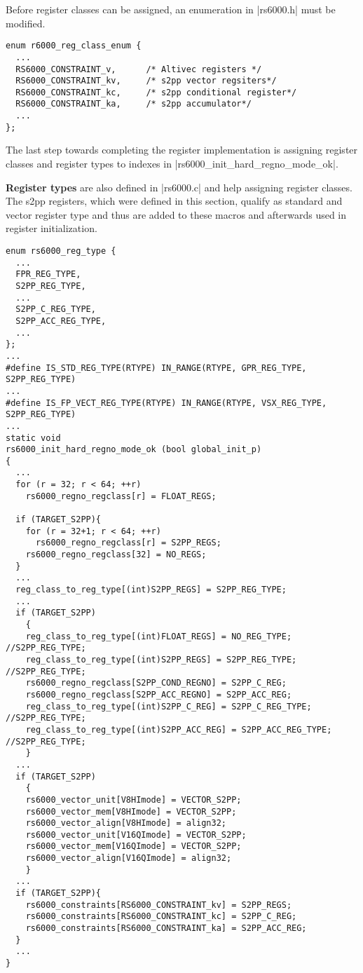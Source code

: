 Before register classes can be assigned, an enumeration in |rs6000.h| must be modified.
\begin{lstlisting}
enum r6000_reg_class_enum {
  ...
  RS6000_CONSTRAINT_v,      /* Altivec registers */
  RS6000_CONSTRAINT_kv,     /* s2pp vector regsiters*/
  RS6000_CONSTRAINT_kc,     /* s2pp conditional register*/
  RS6000_CONSTRAINT_ka,     /* s2pp accumulator*/
  ...
};
\end{lstlisting}

The last step towards completing the register implementation is assigning register classes and register types to indexes in |rs6000_init_hard_regno_mode_ok|.

\textbf{Register types} are also defined in |rs6000.c| and help assigning register classes.
The \ac{s2pp} registers, which were defined in this section, qualify as standard and vector register type and thus are added to these macros and afterwards used in register initialization.
\begin{lstlisting}
enum rs6000_reg_type {
  ...
  FPR_REG_TYPE,
  S2PP_REG_TYPE,
  ...
  S2PP_C_REG_TYPE,
  S2PP_ACC_REG_TYPE,
  ...
};
...
#define IS_STD_REG_TYPE(RTYPE) IN_RANGE(RTYPE, GPR_REG_TYPE, S2PP_REG_TYPE)
...
#define IS_FP_VECT_REG_TYPE(RTYPE) IN_RANGE(RTYPE, VSX_REG_TYPE, S2PP_REG_TYPE)
...
static void
rs6000_init_hard_regno_mode_ok (bool global_init_p)
{
  ...
  for (r = 32; r < 64; ++r)
    rs6000_regno_regclass[r] = FLOAT_REGS;

  if (TARGET_S2PP){
    for (r = 32+1; r < 64; ++r)
      rs6000_regno_regclass[r] = S2PP_REGS;
    rs6000_regno_regclass[32] = NO_REGS;
  }
  ...
  reg_class_to_reg_type[(int)S2PP_REGS] = S2PP_REG_TYPE;
  ...
  if (TARGET_S2PP)
    {
    reg_class_to_reg_type[(int)FLOAT_REGS] = NO_REG_TYPE; //S2PP_REG_TYPE;
    reg_class_to_reg_type[(int)S2PP_REGS] = S2PP_REG_TYPE; //S2PP_REG_TYPE;
    rs6000_regno_regclass[S2PP_COND_REGNO] = S2PP_C_REG;
    rs6000_regno_regclass[S2PP_ACC_REGNO] = S2PP_ACC_REG;
    reg_class_to_reg_type[(int)S2PP_C_REG] = S2PP_C_REG_TYPE; //S2PP_REG_TYPE;
    reg_class_to_reg_type[(int)S2PP_ACC_REG] = S2PP_ACC_REG_TYPE; //S2PP_REG_TYPE;
    }
  ...
  if (TARGET_S2PP)
    {
    rs6000_vector_unit[V8HImode] = VECTOR_S2PP;
    rs6000_vector_mem[V8HImode] = VECTOR_S2PP;
    rs6000_vector_align[V8HImode] = align32;
    rs6000_vector_unit[V16QImode] = VECTOR_S2PP;
    rs6000_vector_mem[V16QImode] = VECTOR_S2PP;
    rs6000_vector_align[V16QImode] = align32;
    }
  ...
  if (TARGET_S2PP){
    rs6000_constraints[RS6000_CONSTRAINT_kv] = S2PP_REGS;
    rs6000_constraints[RS6000_CONSTRAINT_kc] = S2PP_C_REG;
    rs6000_constraints[RS6000_CONSTRAINT_ka] = S2PP_ACC_REG;
  }
  ...
}
\end{lstlisting}

